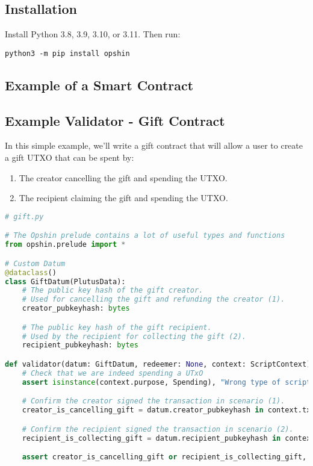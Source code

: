 \subsection{Installation}
Install Python 3.8, 3.9, 3.10, or 3.11. Then run:
\begin{verbatim}
python3 -m pip install opshin
\end{verbatim}

\subsection{Example of a Smart Contract}

\subsection{Example Validator - Gift Contract}
In this simple example, we'll write a gift contract that will allow a user to create a gift UTXO that can be spent by:

\begin{enumerate}
  \item The creator cancelling the gift and spending the UTXO.
  \item The recipient claiming the gift and spending the UTXO.
\end{enumerate}

\begin{lstlisting}[language=Python, caption=Gift Contract in Opshin]
# gift.py

# The Opshin prelude contains a lot of useful types and functions 
from opshin.prelude import *

# Custom Datum
@dataclass()
class GiftDatum(PlutusData):
    # The public key hash of the gift creator.
    # Used for cancelling the gift and refunding the creator (1).
    creator_pubkeyhash: bytes

    # The public key hash of the gift recipient.
    # Used by the recipient for collecting the gift (2).
    recipient_pubkeyhash: bytes

def validator(datum: GiftDatum, redeemer: None, context: ScriptContext) -> None:
    # Check that we are indeed spending a UTxO
    assert isinstance(context.purpose, Spending), "Wrong type of script invocation"

    # Confirm the creator signed the transaction in scenario (1).
    creator_is_cancelling_gift = datum.creator_pubkeyhash in context.tx_info.signatories

    # Confirm the recipient signed the transaction in scenario (2).
    recipient_is_collecting_gift = datum.recipient_pubkeyhash in context.tx_info.signatories

    assert creator_is_cancelling_gift or recipient_is_collecting_gift, "Required signature missing"
\end{lstlisting}

